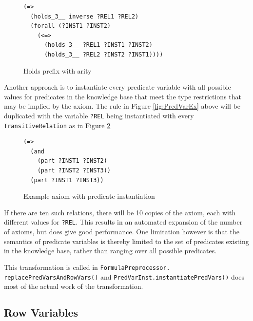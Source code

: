 \documentclass{book}
\begin{document}
\begin{figure}
\begin{framed}
\begin{verbatim}
(=>
  (holds_3__ inverse ?REL1 ?REL2)
  (forall (?INST1 ?INST2)
    (<=>
      (holds_3__ ?REL1 ?INST1 ?INST2)
      (holds_3__ ?REL2 ?INST2 ?INST1))))
\end{verbatim}
\caption{Holds prefix with arity}
\label{fig:HoldsArity}
\end{framed}
\end{figure}

Another approach is to instantiate every predicate variable with all possible
values for predicates in the knowledge base that meet the type restrictions that
may be implied by the axiom.  The rule in Figure \ref{fig:PredVarEx} above will
be duplicated with the variable {\tt ?REL} being instantiated with every {\tt
TransitiveRelation} as in Figure \ref{fig:ExAxPred}

\begin{figure}
\begin{framed}
\begin{verbatim}
(=>
  (and
    (part ?INST1 ?INST2)
    (part ?INST2 ?INST3))
  (part ?INST1 ?INST3))
\end{verbatim}
\caption{Example axiom with predicate instantiation}
\label{fig:ExAxPred}
\end{framed}
\end{figure}

If there are ten such relations, there will be 10 copies of the axiom, each with
different values for {\tt ?REL}. This results in an automated expansion of the
number of axioms, but does give good performance.  One limitation however is
that the semantics of predicate variables is thereby
limited to the set of predicates existing in the knowledge base, rather than
ranging over all possible predicates.

\begin{sloppypar}
This transformation is called in \texttt{FormulaPreprocessor. replacePredVarsAndRowVars()}
and \texttt{PredVarInst.instantiatePredVars()}
does most of the actual work of the
transformation.
\end{sloppypar}

\subsection{Row Variables}
\label{chap:KnowRep:subsec:RowVar}
\end{document}
